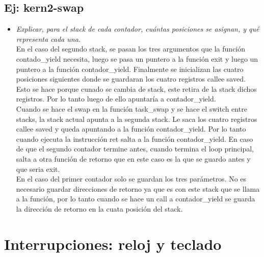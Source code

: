 \documentclass[a4paper, 12pt]{article}
\begin{document}
		\subsection{Ej: kern2-swap}
		\begin{itemize}
			\item \textit{Explicar, para el stack de cada contador, cuántas
			posiciones se asignan, y qué representa cada una.\\}
			En el caso del segundo stack, se pasan los tres argumentos que la
			función contado\_yield necesita, luego se pasa un puntero a la función
			exit y luego un puntero a la función contador\_yield. Finalmente se
			inicializan las cuatro posiciones siguientes donde se guardaran los
			cuatro registros callee saved. Esto se hace porque cunado se cambia de
			stack, este retira de la stack dichos registros. Por lo tanto
			luego de ello apuntaría a contador\_yield.\\
			Cuando se hace el swap en la función task\_swap y se hace el switch
			entre stacks, la stack actual apunta a la segunda stack. Le saca los
			cuatro registros callee saved y queda apuntando a la función
			contador\_yield. Por lo tanto cuando ejecuta la instrucción ret salta a
			la función contador\_yield. En caso de que el segundo contador termine
			antes, cuando termina el loop principal, salta a otra función de retorno
			que en este caso es la que se guardo antes  y que seria exit.\\
			En el caso del primer contador solo se guardan los tres parámetros. No
			es necesario guardar direcciones de retorno ya que es con este stack que
			se llama a la función, por lo tanto cuando se hace un call a
			contador\_yield se guarda la dirección de retorno en la cuata posición
			del stack.
		\end{itemize}
	\section{Interrupciones: reloj y teclado}
\end{document}
